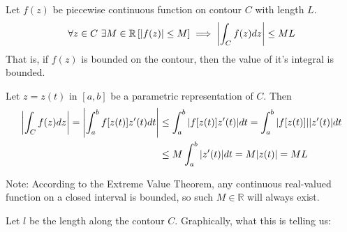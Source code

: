 \documentclass[12pt, english]{book}
\makeatletter
\renewenvironment{proof}[1][\proofname]{\par
	\pushQED{\qed}%
	\normalfont \topsep6\p@\@plus6\p@\relax
	\list{}{%
		\settowidth{\leftmargin}{\itshape\proofname:\hskip\labelsep}%
		\setlength{\labelwidth}{0pt}%
		\setlength{\itemindent}{-\leftmargin}%
		}%
	\item[\hskip\labelsep\itshape#1\@addpunct{:}]\ignorespaces
	}{\popQED\endlist\@endpefalse}
\makeatother
\begin{document}
	\begin{theorem}[ML Inequality]
		\label{ML Inequality Theorem - Complex}
		Let \(f(z)\) be piecewise continuous function on contour \(C\) with length \(L\).
		\begin{align*}
			\forall z \in C \ \exists M \in \mathbb{R} 
			\left[\abs{f(z)} \leq M \right] \implies \abs{\int_{C} f(z) dz} \leq ML 
		\end{align*}
		That is, if \(f(z)\) is bounded on the contour, then the value of it's integral is bounded. 
	\end{theorem}
	\begin{proof}
		Let \(z = z(t)\) in \([a, b]\) be a parametric representation of \(C\). Then
		\begin{align*}
			\abs{\int_{C} f(z) dz} = \abs{\int_{a}^{b} f[z(t)] z'(t) dt} 
			&\leq \int_{a}^{b} \abs{f[z(t)] z'(t)} dt = \int_{a}^{b}  \abs{f[z(t)]} \abs{z'(t)} dt  \\
			&\leq M \int_{a}^{b} \abs{z'(t)} dt = M \abs{z(t)} = ML
		\end{align*}
	\end{proof}

	Note: According to the Extreme Value Theorem, any continuous real-valued function on a closed interval is bounded, so such \(M \in \mathbb{R}\) will always exist. 
	
	\begin{observation}
		Let \(l\) be the length along the contour \(C\). Graphically, what this is telling us:
		\begin{figure}[H]
			\centering
		\end{figure}
	\end{observation}
\end{document}
